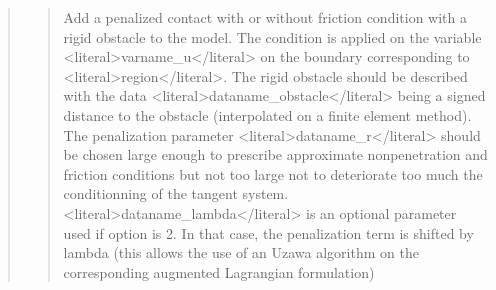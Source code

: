 \documentclass[a4paper,11pt,english]{sphinxmanual}
\begin{document}
\begin{quote}
\begin{quote}
\sphinxAtStartPar
Add a penalized contact with or without friction condition with a
rigid obstacle to the model.
The condition is applied on the variable \textless{}literal\textgreater{}varname\_u\textless{}/literal\textgreater{}
on the boundary corresponding to \textless{}literal\textgreater{}region\textless{}/literal\textgreater{}. The rigid obstacle should
be described with the data \textless{}literal\textgreater{}dataname\_obstacle\textless{}/literal\textgreater{} being a signed distance to
the obstacle (interpolated on a finite element method).
The penalization parameter \textless{}literal\textgreater{}dataname\_r\textless{}/literal\textgreater{} should be chosen
large enough to prescribe approximate non\sphinxhyphen{}penetration and friction
conditions but not too large not to deteriorate too much the
conditionning of the tangent system.
\textless{}literal\textgreater{}dataname\_lambda\textless{}/literal\textgreater{} is an optional parameter used if option
is 2. In that case, the penalization term is shifted by lambda (this
allows the use of an Uzawa algorithm on the corresponding augmented
Lagrangian formulation)
\end{quote}

\sphinxAtStartPar
{}
\begin{quote}


\end{quote}
\end{quote}
\end{document}
